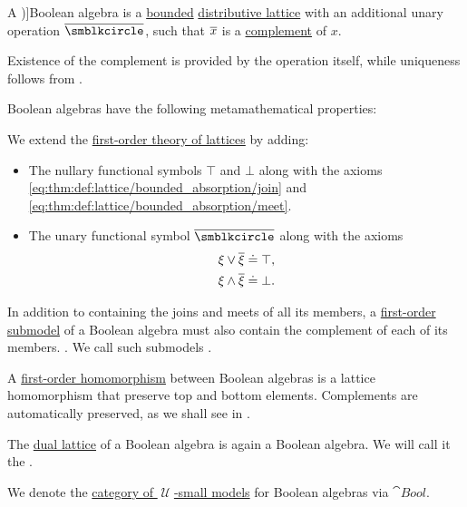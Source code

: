\begin{definition}\label{def:boolean_algebra}
  A \term[ru=булева алгебра (\cite[def. 1.1]{Гуров2013})]{Boolean algebra} is a \hyperref[def:extremal_points/bounds]{bounded} \hyperref[def:distributive_lattice]{distributive lattice} with an additional unary operation \( {\oline \anon} \), such that \( {\oline x} \) is a \hyperref[def:bounded_lattice_complement]{complement} of \( x \).

  Existence of the complement is provided by the operation itself, while uniqueness follows from .

  Boolean algebras have the following metamathematical properties:
  \begin{thmenum}[resume=def:boolean_algebra]
     We extend the \hyperref[def:lattice/theory]{first-order theory of lattices} by adding:
    \begin{itemize}
      \item The nullary functional symbols \( \top \) and \( \bot \) along with the axioms \eqref{eq:thm:def:lattice/bounded_absorption/join} and \eqref{eq:thm:def:lattice/bounded_absorption/meet}.

      \item The unary functional symbol \( {\oline {\anon}} \) along with the axioms
      \begin{align}
        \xi \vee \oline \xi \syneq \top, \label{eq:def:boolean_algebra/join} \\
        \xi \wedge \oline \xi \syneq \bot. \label{eq:def:boolean_algebra/meet}
      \end{align}
    \end{itemize}

     In addition to containing the joins and meets of all its members, a \hyperref[def:first_order_submodel]{first-order submodel} of a Boolean algebra must also contain the complement of each of its members. . We call such submodels .

     A \hyperref[def:first_order_homomorphism]{first-order homomorphism} between Boolean algebras is a lattice homomorphism that preserve top and bottom elements. Complements are automatically preserved, as we shall see in .

     The \hyperref[def:lattice/opposite]{dual lattice} of a Boolean algebra is again a Boolean algebra. We will call it the .

     We denote the \hyperref[def:category_of_small_first_order_models]{category of \( \mscrU \)-small models} for Boolean algebras via \( \cat{Bool} \).
  \end{thmenum}
\end{definition}

